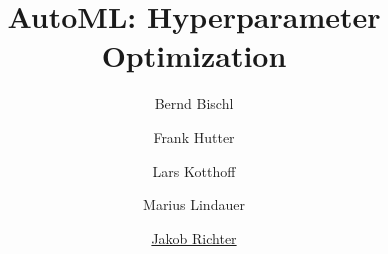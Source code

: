 

\newcommand{\inducer}{\mathcal{I}}
\newcommand{\R}{\mathds{R}}

\newcommand{\xx}{\conf} %
\newcommand{\xxi}[1][i]{\conf_{#1}} %
\newcommand{\XX}{\pcs} %
\newcommand{\f}{\cost} %

\newenvironment{blocki}[1] %
{
 \begin{block}{#1}\begin{itemize}
}
{
\end{itemize}\end{block}
}

\title[AutoML: Hyperparameter Optimization]{AutoML: Hyperparameter Optimization}
\author[Jakob Richter]{Bernd Bischl \and Frank Hutter \and Lars Kotthoff\newline \and Marius Lindauer \and \underline{Jakob Richter}}
\institute{}
\date{}
